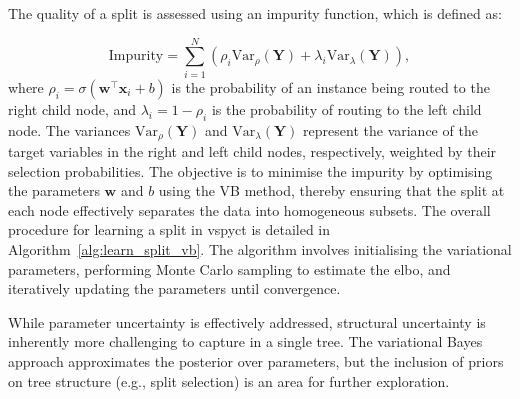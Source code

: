 \documentclass[3p,review,authoryear]{elsarticle}
\begin{document}
The quality of a split is assessed using an impurity function, which is defined as:

\begin{equation}
\text{Impurity} = \sum_{i=1}^{N} \left(\rho_i \text{Var}_{\rho}(\mathbf{Y}) + \lambda_i  \text{Var}_{\lambda}(\mathbf{Y})\right),
\end{equation}
where \(\rho_i = \sigma(\mathbf{w}^\top \mathbf{x}_i + b)\) is the probability of an instance being routed to the right child node, and \(\lambda_i = 1 - \rho_i\) is the probability of routing to the left child node.
The variances \(\text{Var}_{\rho}(\mathbf{Y})\) and \(\text{Var}_{\lambda}(\mathbf{Y})\) represent the variance of the target variables in the right and left child nodes, respectively, weighted by their selection probabilities.
The objective is to minimise the impurity by optimising the parameters \(\mathbf{w}\) and \(b\) using the VB method, thereby ensuring that the split at each node effectively separates the data into homogeneous subsets.
The overall procedure for learning a split in \gls{vspyct} is detailed in Algorithm~\ref{alg:learn_split_vb}.
The algorithm involves initialising the variational parameters, performing Monte Carlo sampling to estimate the \gls{elbo}, and iteratively updating the parameters until convergence.

While parameter uncertainty is effectively addressed, structural uncertainty is inherently more challenging to capture in a single tree. The variational Bayes approach approximates the posterior over parameters, but the inclusion of priors on tree structure (e.g., split selection) is an area for further exploration.
\end{document}
